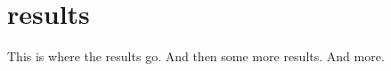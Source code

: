 \chapter{results}
\label{results}

This is where the results go. And then some more results. And more.